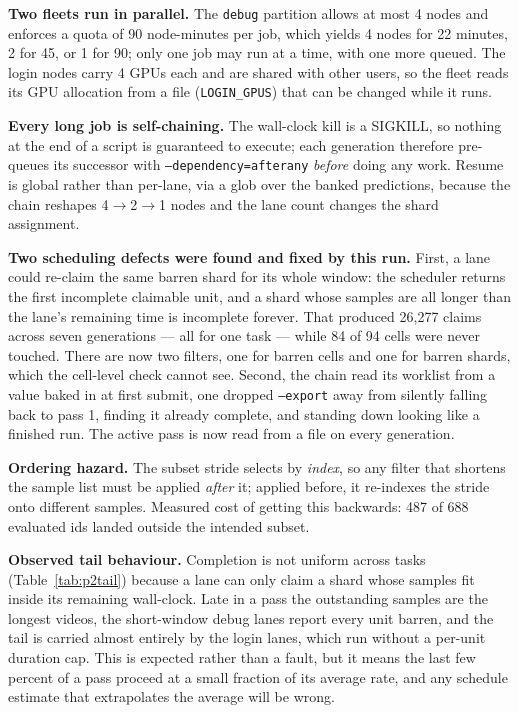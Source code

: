 \documentclass[11pt,a4paper]{article}
\begin{document}
\textbf{Two fleets run in parallel.} The \texttt{debug} partition
allows at most 4 nodes and enforces a quota of 90 node-minutes per job, which
yields 4 nodes for 22 minutes, 2 for 45, or 1 for 90; only one job may run at a
time, with one more queued. The login nodes carry 4 GPUs each and are shared with
other users, so the fleet reads its GPU allocation from a file
(\texttt{LOGIN\_GPUS}) that can be changed while it runs.

\textbf{Every long job is self-chaining.} The wall-clock kill is a
SIGKILL, so nothing at the end of a script is guaranteed to execute; each
generation therefore pre-queues its successor with
\texttt{--dependency=afterany} \emph{before} doing any work. Resume is global
rather than per-lane, via a glob over the banked predictions, because the chain
reshapes 4$\to$2$\to$1 nodes and the lane count changes the shard assignment.

\textbf{Two scheduling defects were found and fixed by this run.}
First, a lane could re-claim the same barren shard for its whole window: the
scheduler returns the first incomplete claimable unit, and a shard whose samples
are all longer than the lane's remaining time is incomplete forever. That
produced 26{,}277 claims across seven generations --- all for one task --- while
84 of 94 cells were never touched. There are now two filters, one for barren
cells and one for barren shards, which the cell-level check cannot see. Second,
the chain read its worklist from a value baked in at first submit, one dropped
\texttt{--export} away from silently falling back to pass 1, finding it already
complete, and standing down looking like a finished run. The active pass is now
read from a file on every generation.

\textbf{Ordering hazard.} The subset stride selects by \emph{index}, so
any filter that shortens the sample list must be applied \emph{after} it; applied
before, it re-indexes the stride onto different samples. Measured cost of getting
this backwards: 487 of 688 evaluated ids landed outside the intended subset.

\textbf{Observed tail behaviour.} Completion is not uniform across
tasks (Table~\ref{tab:p2tail}) because a lane can only claim a shard whose
samples fit inside its remaining wall-clock. Late in a pass the outstanding
samples are the longest videos, the short-window debug lanes report every unit
barren, and the tail is carried almost entirely by the login lanes, which run
without a per-unit duration cap. This is expected rather than a fault, but it
means the last few percent of a pass proceed at a small fraction of its average
rate, and any schedule estimate that extrapolates the average will be wrong.
\end{document}
